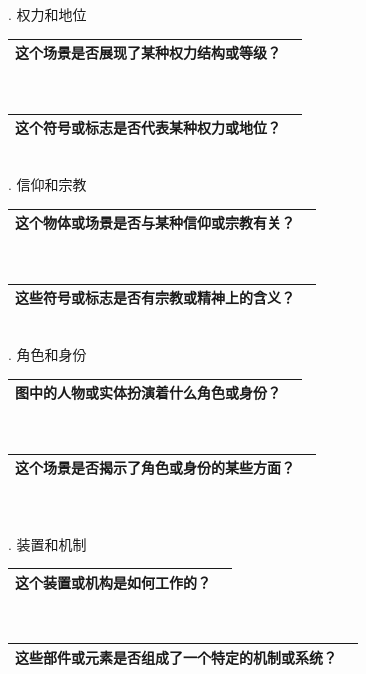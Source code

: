 \documentclass[12pt]{book}
\begin{document}
. 权力和地位

\begin{tabular}{|p{15cm}|p{3cm}|}
	\hline
这个场景是否展现了某种权力结构或等级？\\
	\hline
\end{tabular}\\


\begin{tabular}{|p{15cm}|p{3cm}|}
	\hline
这个符号或标志是否代表某种权力或地位？\\
	\hline
\end{tabular}\\


. 信仰和宗教

\begin{tabular}{|p{15cm}|p{3cm}|}
	\hline
这个物体或场景是否与某种信仰或宗教有关？\\
	\hline
\end{tabular}\\


\begin{tabular}{|p{15cm}|p{3cm}|}
	\hline
这些符号或标志是否有宗教或精神上的含义？\\
	\hline
\end{tabular}\\

. 角色和身份

\begin{tabular}{|p{15cm}|p{3cm}|}
	\hline
图中的人物或实体扮演着什么角色或身份？\\
	\hline
\end{tabular}\\



\begin{tabular}{|p{15cm}|p{3cm}|}
	\hline
这个场景是否揭示了角色或身份的某些方面？\\
	\hline
\end{tabular}\\\\



. 装置和机制

\begin{tabular}{|p{15cm}|p{3cm}|}
	\hline
这个装置或机构是如何工作的？\\
	\hline
\end{tabular}\\


\begin{tabular}{|p{15cm}|p{3cm}|}
	\hline
这些部件或元素是否组成了一个特定的机制或系统？\\
	\hline
\end{tabular}\\
\end{document}
